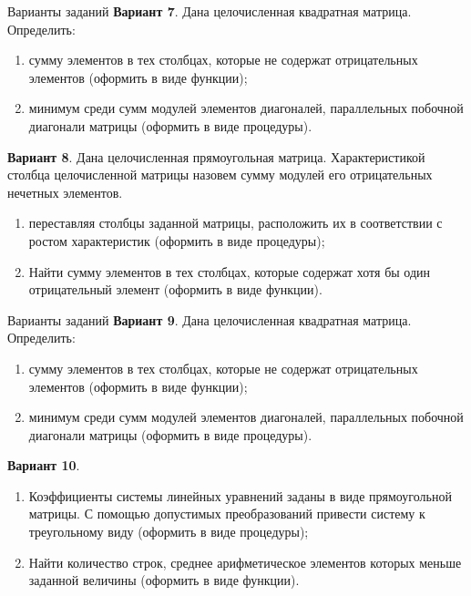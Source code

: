 \documentclass{beamer}
\begin{document}
\begin{frame}{Варианты заданий}
\textbf{Вариант 7}. Дана целочисленная квадратная матрица. Определить:
\begin{enumerate}
\item сумму элементов в тех столбцах, которые не содержат отрицательных элементов (оформить в виде функции);
\item минимум среди сумм модулей элементов диагоналей, параллельных побочной диагонали матрицы (оформить в виде процедуры).
\end{enumerate}
\textbf{Вариант 8}. Дана целочисленная прямоугольная матрица. Характеристикой столбца целочисленной матрицы назовем сумму модулей его отрицательных нечетных элементов. 
\begin{enumerate}
\item переставляя столбцы заданной матрицы, расположить их в соответствии с ростом характеристик (оформить в виде
процедуры); 
\item Найти сумму элементов в тех столбцах, которые содержат хотя бы один отрицательный элемент (оформить в виде функции).
\end{enumerate}
\end{frame}

\begin{frame}{Варианты заданий}
\textbf{Вариант 9}. Дана целочисленная квадратная матрица. Определить:
\begin{enumerate}
\item сумму элементов в тех столбцах, которые не содержат отрицательных элементов (оформить в виде функции);
\item минимум среди сумм модулей элементов диагоналей, параллельных побочной диагонали матрицы (оформить в виде процедуры).
\end{enumerate}
\textbf{Вариант 10}. 
\begin{enumerate}
\item Коэффициенты системы линейных уравнений заданы в виде прямоугольной матрицы. С помощью допустимых преобразований привести систему к треугольному виду (оформить в виде процедуры); 
\item Найти количество строк, среднее арифметическое элементов которых меньше заданной величины (оформить в виде функции).
\end{enumerate}
\end{frame}
\end{document}
